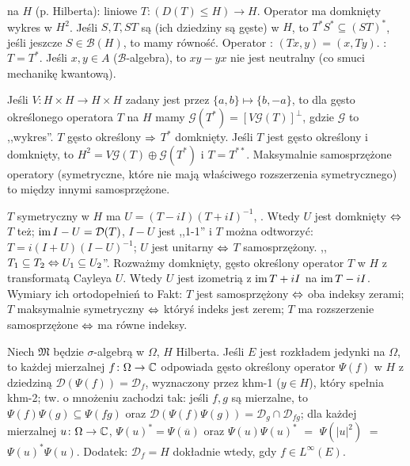   na $H$ (p. Hilberta): liniowe $T \colon (D(T) \le H) \to H$.
Operator  ma domknięty wykres w $H^2$.
Jeśli $S, T, ST$ są  (ich dziedziny są gęste) w $H$, to $T^*S^* \subseteq (ST)^*$, jeśli jeszcze $S \in \mathcal B(H)$, to mamy równość.
Operator : $(Tx,y) = (x,Ty)$.
: $T = T^*$.
Jeśli $x, y \in A$ ($\mathscr B$-algebra), to $xy-yx$ nie jest neutralny (co smuci mechanikę kwantową).

Jeśli  $V \colon H \times H \to H \times H$ zadany jest przez $\{a, b\} \mapsto \{b, -a\}$, to dla gęsto określonego operatora $T$ na $H$ mamy $\mathcal G(T^*) = [V \mathcal G(T)]^\perp$, gdzie $\mathcal G$ to ,,wykres''.
$T$ gęsto określony $\Rightarrow$ $T^*$ domknięty.
Jeśli $T$ jest gęsto określony i domknięty, to $H^2 = V\mathcal G(T) \oplus \mathcal G(T^*)$ i $T=T^{**}$.
Maksymalnie samosprzężone operatory (symetryczne, które nie mają właściwego rozszerzenia symetrycznego) to między innymi samosprzężone.

$T$  symetryczny w $H$ ma $U = (T-iI)(T+iI)^{-1}$, .
Wtedy $U$ jest domknięty $\Leftrightarrow$ $T$ też; $\operatorname{im} I-U = \mathcal D(T)$, $I-U$ jest ,,1-1'' i $T$ można odtworzyć: $T = i(I+U) (I-U)^{-1}$; $U$ jest unitarny $\Leftrightarrow$ $T$ samosprzężony.
,,$T_1 \subseteq T_2 \Leftrightarrow U_1 \subseteq U_2$''.
Rozważmy domknięty, gęsto określony operator $T$ w $H$ z transformatą Cayleya $U$. 
Wtedy $U$ jest izometrią z $\operatorname{im} T + i I$ na $\operatorname{im} T - iI$.
Wymiary ich ortodopełnień to 
Fakt: $T$ jest samosprzężony $\Leftrightarrow$ oba indeksy zerami; $T$ maksymalnie symetryczny $\Leftrightarrow$ któryś indeks jest zerem; $T$ ma rozszerzenie samosprzężone $\Leftrightarrow$ ma równe indeksy.

Niech  $\mathfrak M$ będzie $\sigma$-algebrą w $\Omega$, $H$ Hilberta.
Jeśli $E$ jest rozkładem jedynki na $\Omega$, to każdej mierzalnej $f \colon \Omega \to \mathbb{C}$ odpowiada gęsto określony operator $\Psi(f)$ w $H$ z dziedziną $\mathcal D(\Psi(f)) = \mathcal D_f$, wyznaczony przez khm-1 ($y \in H$), który spełnia khm-2; tw. o mnożeniu zachodzi tak: jeśli $f, g$ są mierzalne, to $\Psi(f)\Psi(g) \subseteq \Psi(fg)$ oraz $\mathcal D(\Psi(f)\Psi(g)) = \mathcal D_g \cap \mathcal D_{fg}$; dla każdej mierzalnej $u \colon \Omega \to \mathbb{C}$, $\Psi(u)^* = \Psi(\overline{u})$ oraz $\Psi(u)\Psi(u)^*$ $=$ $\Psi(|u|^2)$ $=$ $\Psi(u)^*\Psi(u)$.
Dodatek: $\mathcal D_f = H$ dokładnie wtedy, gdy $f \in L^\infty(E)$.

